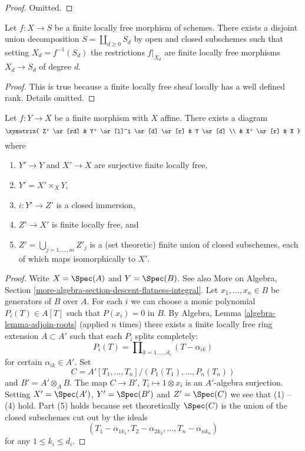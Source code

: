 \begin{proof}
Omitted.
\end{proof}

\begin{lemma}
\label{lemma-finite-locally-free}
Let $f : X \to S$ be a finite locally free morphism of schemes.
There exists a disjoint union decomposition
$S = \coprod_{d \geq 0} S_d$ by open and closed subschemes
such that setting $X_d = f^{-1}(S_d)$ the restrictions
$f|_{X_d}$ are finite locally free morphisms $X_d \to S_d$
of degree $d$.
\end{lemma}

\begin{proof}
This is true because a finite locally free sheaf locally has
a well defined rank. Details omitted.
\end{proof}

\begin{lemma}
\label{lemma-massage-finite}
Let $f : Y \to X$ be a finite morphism with $X$ affine.
There exists a diagram
$$
\xymatrix{
Z' \ar[rd] &
Y' \ar[l]^i \ar[d] \ar[r] &
Y \ar[d] \\
 & X' \ar[r] & X
}
$$
where
\begin{enumerate}
\item $Y' \to Y$ and $X' \to X$ are surjective finite locally free,
\item $Y' = X' \times_X Y$,
\item $i : Y' \to Z'$ is a closed immersion,
\item $Z' \to X'$ is finite locally free, and
\item $Z' = \bigcup_{j = 1, \ldots, m} Z'_j$ is a (set theoretic)
finite union of closed subschemes, each of which maps isomorphically
to $X'$.
\end{enumerate}
\end{lemma}

\begin{proof}
Write $X = \Spec(A)$ and $Y = \Spec(B)$. See also
More on Algebra, Section \ref{more-algebra-section-descent-flatness-integral}.
Let $x_1, \ldots, x_n \in B$ be generators of $B$ over $A$.
For each $i$ we can choose a monic polynomial $P_i(T) \in A[T]$
such that $P(x_i) = 0$ in $B$. By
Algebra, Lemma \ref{algebra-lemma-adjoin-roots}
(applied $n$ times) there exists a finite locally free ring
extension $A \subset A'$ such that each $P_i$ splits completely:
$$
P_i(T) = \prod\nolimits_{k = 1, \ldots, d_i} (T - \alpha_{ik})
$$
for certain $\alpha_{ik} \in A'$. Set
$$
C = A'[T_1, \ldots, T_n]/(P_1(T_1), \ldots, P_n(T_n))
$$
and $B' = A' \otimes_A B$. The map $C \to B'$, $T_i \mapsto 1 \otimes x_i$
is an $A'$-algebra surjection. Setting $X' = \Spec(A')$,
$Y' = \Spec(B')$ and $Z' = \Spec(C)$ we see that
(1) -- (4) hold. Part (5) holds because set theoretically
$\Spec(C)$ is the union of the closed subschemes
cut out by the ideals
$$
(T_1 - \alpha_{1k_1}, T_2 - \alpha_{2k_2}, \ldots, T_n - \alpha_{nk_n})
$$
for any $1 \leq k_i \leq d_i$.
\end{proof}

